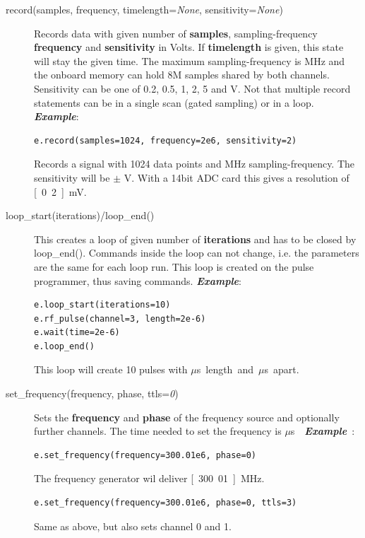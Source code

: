 \documentclass[12pt, a4paper, BCOR10mm, twoside, titlepage, headinclude]{scrbook}
\begin{document}
\begin{description}
\item[record(samples, frequency, timelength=\textit{None}, sensitivity=\textit{None})]
Records data with given number of \textbf{samples}, sampling-frequency \textbf{frequency} and \textbf{sensitivity} in Volts.
If \textbf{timelength} is given, this state will stay the given time. The maximum sampling-frequency is  \unit[20]{MHz} and the onboard memory can hold 8M samples shared by both channels. Sensitivity can be one of 0.2, 0.5, 1, 2, 5 and  \unit[10]{V}.
Not that multiple  record statements can be in a single scan (gated sampling) or in a loop.
\newline
\emph{\textbf{Example}}:
\begin{lstlisting}
e.record(samples=1024, frequency=2e6, sensitivity=2)
\end{lstlisting}
Records a signal with 1024 data points and \unit[2]{MHz} sampling-frequency. The sensitivity will be $\pm$ \unit[2]{V}. With a 14bit ADC  card this gives a resolution of  \unit[0.2]{mV}. 


\item[loop\_start(iterations)/loop\_end()]
This creates a loop of given number of \textbf{iterations} and has to be closed by loop\_end().
Commands inside the loop can not change, i.e. the parameters are the same for each loop run. This loop is created on the pulse programmer, thus saving commands.
\newline
\emph{\textbf{Example}}:
\begin{lstlisting}
e.loop_start(iterations=10)
e.rf_pulse(channel=3, length=2e-6) 
e.wait(time=2e-6)
e.loop_end()
\end{lstlisting}
This loop will create 10 pulses with \unit[2]{$\mu$s} length and \unit[2]{$\mu$s} apart.

\item[set\_frequency(frequency, phase, ttls=\textit{0})]
Sets the \textbf{frequency} and \textbf{phase} of the frequency source and optionally further channels. The time needed to set the frequency is \unit[2]{$\mu$s}.
\newline
\emph{\textbf{Example}}:
\begin{lstlisting}
e.set_frequency(frequency=300.01e6, phase=0)
\end{lstlisting}
The frequency generator wil deliver  \unit[300.01]{MHz}.
\begin{lstlisting}
e.set_frequency(frequency=300.01e6, phase=0, ttls=3)
\end{lstlisting}
Same as above, but also sets channel 0 and 1.


\end{description}
\end{document}
